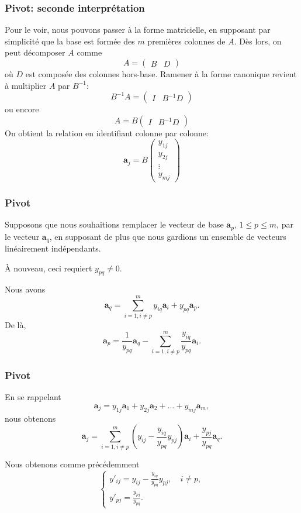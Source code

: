 \documentclass[t,usepdftitle=false]{beamer}
\def\ba{\boldsymbol{a}}
\begin{document}
\begin{frame}
\frametitle{Pivot: seconde interprétation}

Pour le voir, nous pouvons passer à la forme matricielle, en supposant par simplicité que la base est formée des $m$ premières colonnes de $A$. Dès lors, on peut décomposer $A$ comme
\[
A = \begin{pmatrix} B & D \end{pmatrix}
\]
où $D$ est composée des colonnes hors-base. Ramener à la forme canonique revient à multiplier $A$ par $B^{-1}$:
\[
B^{-1}A = \begin{pmatrix} I & B^{-1}D \end{pmatrix}
\]
ou encore
\[
A = B\begin{pmatrix} I & B^{-1}D \end{pmatrix}
\]
On obtient la relation en identifiant colonne par colonne:
\[
\ba_j = B\begin{pmatrix} y_{1j} \\ y_{2j} \\ \vdots  \\  y_{mj}\end{pmatrix}
\]

\end{frame}

\begin{frame}
\frametitle{Pivot}

Supposons que nous souhaitions remplacer le vecteur de base $\ba_p$, $1 \leq p \leq m$, par le vecteur $\ba_q$, en supposant de plus que nous gardions un ensemble de vecteurs linéairement indépendants.

\mbox{}

À nouveau, ceci requiert $y_{pq} \ne 0$.

\mbox{}

Nous avons
\[
\ba_q = \sum_{i = 1, i \ne p}^m y_{iq}\ba_i + y_{pq} \ba_p.
\]
De là,
\[
\ba_p = \frac{1}{y_{pq}}\ba_q - \sum_{i = 1, i \ne p}^m \frac{y_{iq}}{y_{pq}}\ba_i.
\]

\end{frame}

\begin{frame}
\frametitle{Pivot}

En se rappelant
\[
\ba_j = y_{1j} \ba_1 + y_{2j} \ba_2 + \ldots + y_{mj} \ba_m,
\]
nous obtenons
\[
\ba_j = \sum_{i = 1, i \ne p}^m \left( y_{ij} - \frac{y_{iq}}{y_{pq}} y_{pj} \right)\ba_i +
\frac{y_{pj}}{y_{pq}} \ba_q.
\]

\mbox{}

Nous obtenons comme précédemment
\[
\begin{cases}
y'_{ij} = y_{ij} 
 - \frac{y_{iq}}{y_{pq}} y_{pj}, \quad i \ne p, \\
 y'_{pj} = \frac{y_{pj}}{y_{pq}}.
 \end{cases}
\]

\mbox{}

\end{frame}
\end{document}
